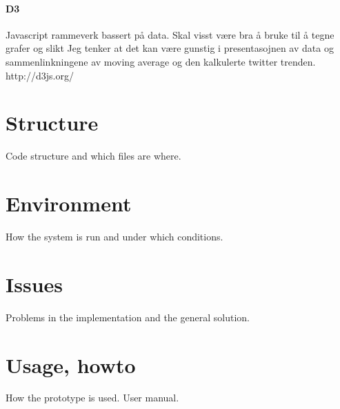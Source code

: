 \paragraph{D3}
Javascript rammeverk bassert på data.
Skal visst være bra å bruke til å tegne grafer og slikt
Jeg tenker at det kan være gunstig i presentasojnen av data og sammenlinkningene
av moving average og den kalkulerte twitter trenden.
http://d3js.org/

\section{Structure}
Code structure and which files are where.
\section{Environment}
How the system is run and under which conditions.
\section{Issues}
Problems in the implementation and the general solution.

\section{Usage, howto}
How the prototype is used. User manual. 


